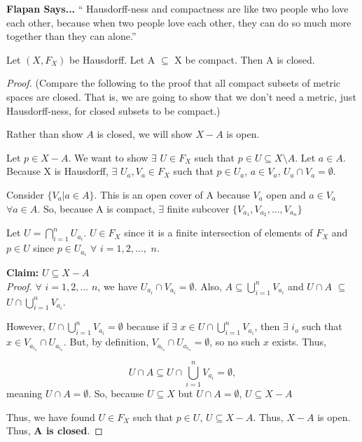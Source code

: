 \textbf{Flapan Says...} `` Hausdorff-ness and compactness are like two people who love each other, because when two people love each other, they can do so much more together than they can alone.'' \\
\begin{theorem}
	Let $(X, F_X)$ be Hausdorff. Let A $\subseteq$ X be compact. Then A is closed. 
\end{theorem}
\begin{proof}
	(Compare the following to the proof that all compact subsets of metric spaces are closed. That is, we are going to show that we don't need a metric, just Hausdorff-ness, for closed subsets to be compact.)
	
	Rather than show $A$ is closed, we will show $X-A$ is open.
	
	Let $p \in X-A$. We want to show $\exists$ $U \in F_X$ such that $p \in U \subseteq X\setminus A$. Let $a \in A$. Because X is Hausdorff, $\exists$ $U_a, V_a \in F_X$ such that $p \in U_a$, $a \in V_a$, $U_a \cap V_a = \emptyset$.
	
	Consider $\{ V_a | a \in A\}$. This is an open cover of A because $V_a$ open and $a \in V_a$ $\forall a \in A$. So, because A is compact, $\exists$ finite subcover $\{ V_{a_1}, V_{a_2}, ..., V_{a_n}\}$
	
	Let $U = \bigcap_{i=1}^{n} U_{a_i}$. $U \in F_X$ since it is a finite intersection of elements of $F_X$ and $p \in U$ since $p \in U_{a_i}$ $\forall$ $i=1, 2, ...,$ $n$.
	
	\textbf{Claim:} $U \subseteq X-A$\\
	\emph{Proof.} $\forall$ $i=1, 2, ...$ $n$, we have $U_{a_i} \cap V_{a_i} = \emptyset$. Also, $A \subseteq \bigcup_{i=1}^{n} V_{a_i}$ and $U \cap A$ $\subseteq$ $U \cap \bigcup_{i=1}^{n} V_{a_i}$.
	
	However, $U \cap \bigcup_{i=1}^{n} V_{a_i} = \emptyset$ because if $\exists$ $x \in U \cap \bigcup_{i=1}^{n} V_{a_i}$, then $\exists$ $i_o$ such that $x \in V_{a_{i_o}} \cap U_{a_{i_o}}$. But, by definition, $V_{a_{i_o}} \cap U_{a_{i_o}} = \emptyset$, so no such $x$ exists. Thus,
	
	\[U \cap A\subseteq U \cap \bigcup_{i=1}^{n} V_{a_i} = \emptyset,\]
	meaning $U \cap A = \emptyset$. So, because $U \subseteq X$ but $U \cap A = \emptyset$, $U \subseteq X-A$
	
	Thus, we have found $U \in F_X$ such that $p \in U$, $U \subseteq X-A$. Thus, $X-A$ is open. Thus, \textbf{A is closed}. 
\end{proof}
